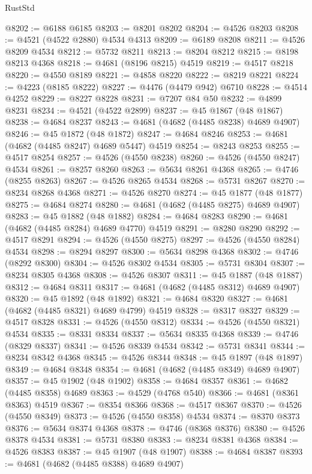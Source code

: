 \begin{lexlean}{RustStd}
\begin{coremodule}
@8202 := @6188 @6185
@8203 := @8201 @8202
@8204 := @4526 @8203
@8208 := @4521 (@4522 @2880) @4534 @4313
@8209 := @6189 @8208
@8211 := @4526 @8209 @4534
@8212 := @5732 @8211
@8213 := @8204 @8212
@8215 := @8198 @8213 @4368
@8218 := @4681 (@8196 @8215) @4519
@8219 := @4517 @8218
@8220 := @4550 @8189
@8221 := @4858 @8220
@8222 := @8219 @8221
@8224 := @4223 (@8185 @8222)
@8227 := @4476 (@4479 @942) @6710
@8228 := @4514 @4252
@8229 := @8227 @8228
@8231 := @7207 @84 @50
@8232 := @4899 @8231
@8234 := @4521 (@4522 @2899)
@8237 := @45 @1867 (@48 @1867)
@8238 := @4684 @8237
@8243 := @4681 (@4682 (@4485 @8238) @4689 @4907)
@8246 := @45 @1872 (@48 @1872)
@8247 := @4684 @8246
@8253 := @4681 (@4682 (@4485 @8247) @4689 @5447) @4519
@8254 := @8243 @8253
@8255 := @4517 @8254
@8257 := @4526 (@4550 @8238)
@8260 := @4526 (@4550 @8247) @4534
@8261 := @8257 @8260
@8263 := @5634 @8261 @4368
@8265 := @4746 (@8255 @8263)
@8267 := @4526 @8265 @4534
@8268 := @5731 @8267
@8270 := @8234 @8268 @4368
@8271 := @4526 @8270
@8274 := @45 @1877 (@48 @1877)
@8275 := @4684 @8274
@8280 := @4681 (@4682 (@4485 @8275) @4689 @4907)
@8283 := @45 @1882 (@48 @1882)
@8284 := @4684 @8283
@8290 := @4681 (@4682 (@4485 @8284) @4689 @4770) @4519
@8291 := @8280 @8290
@8292 := @4517 @8291
@8294 := @4526 (@4550 @8275)
@8297 := @4526 (@4550 @8284) @4534
@8298 := @8294 @8297
@8300 := @5634 @8298 @4368
@8302 := @4746 (@8292 @8300)
@8304 := @4526 @8302 @4534
@8305 := @5731 @8304
@8307 := @8234 @8305 @4368
@8308 := @4526 @8307
@8311 := @45 @1887 (@48 @1887)
@8312 := @4684 @8311
@8317 := @4681 (@4682 (@4485 @8312) @4689 @4907)
@8320 := @45 @1892 (@48 @1892)
@8321 := @4684 @8320
@8327 := @4681 (@4682 (@4485 @8321) @4689 @4799) @4519
@8328 := @8317 @8327
@8329 := @4517 @8328
@8331 := @4526 (@4550 @8312)
@8334 := @4526 (@4550 @8321) @4534
@8335 := @8331 @8334
@8337 := @5634 @8335 @4368
@8339 := @4746 (@8329 @8337)
@8341 := @4526 @8339 @4534
@8342 := @5731 @8341
@8344 := @8234 @8342 @4368
@8345 := @4526 @8344
@8348 := @45 @1897 (@48 @1897)
@8349 := @4684 @8348
@8354 := @4681 (@4682 (@4485 @8349) @4689 @4907)
@8357 := @45 @1902 (@48 @1902)
@8358 := @4684 @8357
@8361 := @4682 (@4485 @8358) @4689
@8363 := @4529 (@4768 @540)
@8366 := @4681 (@8361 @8363) @4519
@8367 := @8354 @8366
@8368 := @4517 @8367
@8370 := @4526 (@4550 @8349)
@8373 := @4526 (@4550 @8358) @4534
@8374 := @8370 @8373
@8376 := @5634 @8374 @4368
@8378 := @4746 (@8368 @8376)
@8380 := @4526 @8378 @4534
@8381 := @5731 @8380
@8383 := @8234 @8381 @4368
@8384 := @4526 @8383
@8387 := @45 @1907 (@48 @1907)
@8388 := @4684 @8387
@8393 := @4681 (@4682 (@4485 @8388) @4689 @4907)

\end{coremodule}
\end{lexlean}
